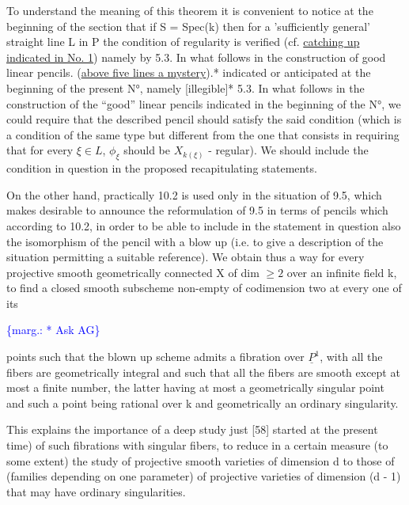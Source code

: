 \documentclass[11pt]{article}
\newcommand{\scanpage}[1]{\par\bigskip\noindent{\small\sffamily[scan #1]}\par}
\newcommand{\mspage}[1]{{\small\sffamily[p.\,#1]}}
\newcommand{\margin}[1]{\textcolor{blue}{\{\textsf{marg.:} #1\}}}
\newcommand{\uline}[1]{\underline{#1}}
\begin{document}
To understand the meaning of this theorem it is convenient to
notice at the beginning of the section that if S = Spec(k) then
for a 'sufficiently general' straight line L in P the condition of
regularity is verified (cf. \uline{catching up indicated in No. 1}) namely
by 5.3.  In what follows in the construction of good linear
pencils.  (\uline{above five lines a mystery}).*
indicated or anticipated at the beginning of the present N°, namely
[illegible]* 5.3.  In what follows in the construction of the
``good'' linear pencils indicated in the beginning of the N°, we
could require that the described pencil should satisfy the said
condition (which is a condition of the same type but different
from the one that consists in requiring that for every $\xi \in L$, $\phi_\xi$
should be $X_{k(\xi)}$ - regular).  We should include the condition in
question in the proposed recapitulating statements.

On the other hand, practically 10.2 is used only in the
situation of 9.5, which makes desirable to announce the
reformulation of 9.5 in terms of pencils which according to 10.2,
in order to be able to include in the statement in question also
the isomorphism of the pencil with a blow up (i.e. to give a
description of the situation permitting a suitable reference).  We
obtain thus a way for every projective smooth geometrically
connected X of dim $\geq 2$ over an infinite field k, to find a closed
smooth subscheme non-empty of codimension two at every one of its

\margin{* Ask AG}

\clearpage
\scanpage{24/70}
\mspage{70}

points such that the blown up scheme admits a fibration over $\underline{P}^1$,
with all the fibers are geometrically integral and such that all
the fibers are smooth except at most a finite number, the latter
having at most a geometrically singular point and such a point
being rational over k and geometrically an ordinary singularity.

This explains the importance of a deep study just [58]
started at the present time) of such fibrations with singular
fibers, to reduce in a certain measure (to some extent) the study
of projective smooth varieties of dimension d to those of
(families depending on one parameter) of projective varieties of
dimension (d - 1) that may have ordinary singularities.
\end{document}
